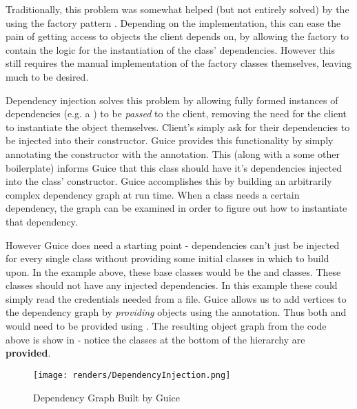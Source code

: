 

Traditionally, this problem was somewhat helped (but not entirely solved) by the using the factory pattern \cite{factoryMethodPattern}. Depending on the implementation, this can ease the pain of getting access to objects the client depends on, by allowing the factory to contain the logic for the instantiation of the class' dependencies. However this still requires the manual implementation of the factory classes themselves, leaving much to be desired.


Dependency injection solves this problem by allowing fully formed instances of dependencies (e.g. a ) to be \textit{passed} to the client, removing the need for the client to instantiate the object themselves. Client's simply ask for their dependencies to be injected into their constructor. Guice provides this functionality by simply annotating the constructor with the  annotation. This (along with a some other boilerplate) informs Guice that this class should have it's dependencies injected into the class' constructor. Guice accomplishes this by building an arbitrarily complex dependency graph at run time. When a class needs a certain dependency, the graph can be examined in order to figure out how to instantiate that dependency. 

However Guice does need a starting point - dependencies can't just be injected for every single class without providing some initial classes in which to build upon. In the example above, these base classes would be the  and  classes. These classes should not have any injected dependencies. In this example these could simply read the credentials needed from a file. Guice allows us to add vertices to the dependency graph by \textit{providing} objects using the  annotation. Thus both  and  would need to be provided using . The resulting object graph from the code above is show in  - notice the classes at the bottom of the hierarchy are \textbf{provided}. 

\begin{figure}[H]
      \centering
      \texttt{[image: renders/DependencyInjection.png]}
      \caption{Dependency Graph Built by Guice}
      \label{fig:depGraph}
\end{figure}

